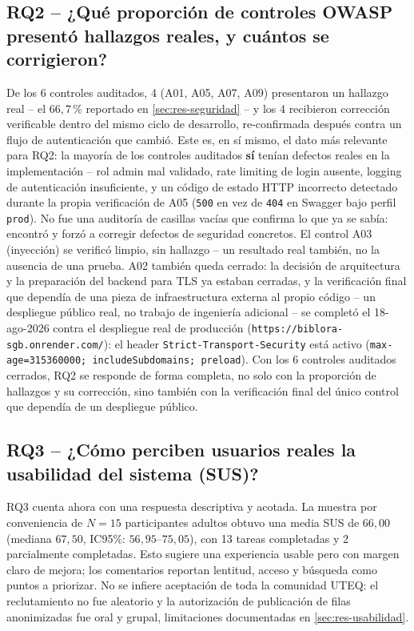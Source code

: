 \subsection*{RQ2 -- ¿Qué proporción de controles OWASP presentó hallazgos reales, y cuántos se corrigieron?}

De los 6 controles auditados, 4 (A01, A05, A07, A09) presentaron un
hallazgo real -- el $66{,}7$\,\% reportado en
\autoref{sec:res-seguridad} -- y los 4 recibieron corrección verificable
dentro del mismo ciclo de desarrollo, re-confirmada después contra un
flujo de autenticación que cambió. Este es, en sí mismo, el dato más
relevante para RQ2: la mayoría de los controles auditados \textbf{sí}
tenían defectos reales en la implementación -- rol admin mal validado,
rate limiting de login ausente, logging de autenticación insuficiente, y
un código de estado HTTP incorrecto detectado durante la propia
verificación de A05 (\texttt{500} en vez de \texttt{404} en Swagger bajo
perfil \texttt{prod}). No fue una auditoría de casillas vacías que
confirma lo que ya se sabía: encontró y forzó a corregir defectos de
seguridad concretos. El control A03 (inyección) se verificó limpio, sin
hallazgo -- un resultado real también, no la ausencia de una prueba. A02
también queda cerrado: la decisión de arquitectura y la preparación del
backend para TLS ya estaban cerradas, y la verificación final que
dependía de una pieza de infraestructura externa al propio código -- un
despliegue público real, no trabajo de ingeniería adicional -- se
completó el 18-ago-2026 contra el despliegue real de producción
(\texttt{https://biblora-sgb.onrender.com/}): el header
\texttt{Strict-Transport-Security} está activo
(\texttt{max-age=315360000; includeSubdomains; preload}). Con los 6
controles auditados cerrados, RQ2 se responde de forma completa, no
solo con la proporción de hallazgos y su corrección, sino también con
la verificación final del único control que dependía de un despliegue
público.

\subsection*{RQ3 -- ¿Cómo perciben usuarios reales la usabilidad del sistema (SUS)?}

RQ3 cuenta ahora con una respuesta descriptiva y acotada. La muestra por
conveniencia de $N=15$ participantes adultos obtuvo una media SUS de
$66{,}00$ (mediana $67{,}50$, IC95\%: $56{,}95$--$75{,}05$), con 13 tareas
completadas y 2 parcialmente completadas. Esto sugiere una experiencia
usable pero con margen claro de mejora; los comentarios reportan lentitud,
acceso y búsqueda como puntos a priorizar. No se infiere aceptación de toda
la comunidad UTEQ: el reclutamiento no fue aleatorio y la autorización de
publicación de filas anonimizadas fue oral y grupal, limitaciones documentadas
en \autoref{sec:res-usabilidad}.

